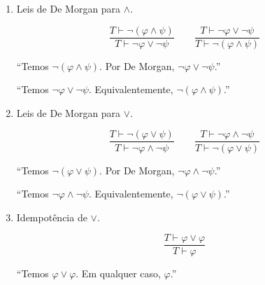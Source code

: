 \begin{metaproposition}
\begin{enumerate}[label=(\roman*)]
        ``Temos $\varphi\lor(\psi\land\theta)$, equivalentemente, $(\varphi\lor\psi)\land(\varphi\lor\theta)$.''

        \item Leis de De Morgan para $\land$.
        
        \[
            \frac{T\vdash \neg(\varphi\land\psi)}
                 {T\vdash \neg\varphi\lor\neg\psi}
            \qquad
            \frac{T\vdash \neg\varphi\lor\neg\psi}
                 {T\vdash \neg(\varphi\land\psi)}
        \]

        ``Temos $\neg(\varphi\land\psi)$.
        Por De Morgan, $\neg\varphi\lor\neg\psi$.''

        ``Temos $\neg\varphi\lor\neg\psi$.
        Equivalentemente, $\neg(\varphi\land\psi)$.''

        \item Leis de De Morgan para $\lor$.
        
        \[
            \frac{T\vdash \neg(\varphi\lor\psi)}
                 {T\vdash \neg\varphi\land\neg\psi}
            \qquad
            \frac{T\vdash \neg\varphi\land\neg\psi}
                 {T\vdash \neg(\varphi\lor\psi)}
        \]

        ``Temos $\neg(\varphi\lor\psi)$.
        Por De Morgan, $\neg\varphi\land\neg\psi$.''
        
        ``Temos $\neg\varphi\land\neg\psi$.
        Equivalentemente, $\neg(\varphi\lor\psi)$.''

        \item Idempotência de $\lor$.
        
        \[
            \frac{T\vdash \varphi\lor \varphi}
                 {T\vdash \varphi}
        \]

        ``Temos $\varphi\lor\varphi$.
        Em qualquer caso, $\varphi$.''
    \end{enumerate}
\end{metaproposition}

